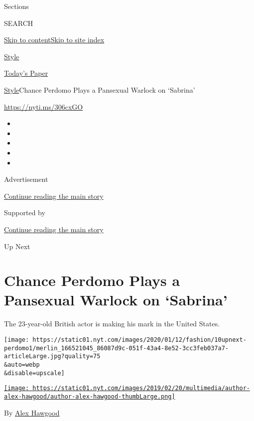 Sections

SEARCH

\protect\hyperlink{site-content}{Skip to
content}\protect\hyperlink{site-index}{Skip to site index}

\href{https://www.nytimes.com/section/style}{Style}

\href{https://myaccount.nytimes.com/auth/login?response_type=cookie\&client_id=vi}{}

\href{https://www.nytimes.com/section/todayspaper}{Today's Paper}

\href{/section/style}{Style}\textbar{}Chance Perdomo Plays a Pansexual
Warlock on `Sabrina'

\href{https://nyti.ms/306cxGO}{https://nyti.ms/306cxGO}

\begin{itemize}
\item
\item
\item
\item
\item
\end{itemize}

Advertisement

\protect\hyperlink{after-top}{Continue reading the main story}

Supported by

\protect\hyperlink{after-sponsor}{Continue reading the main story}

Up Next

\hypertarget{chance-perdomo-plays-a-pansexual-warlock-on-sabrina}{%
\section{Chance Perdomo Plays a Pansexual Warlock on
`Sabrina'}\label{chance-perdomo-plays-a-pansexual-warlock-on-sabrina}}

The 23-year-old British actor is making his mark in the United States.

\texttt{[image: https://static01.nyt.com/images/2020/01/12/fashion/10upnext-perdomo1/merlin\_166521045\_86087d9c-051f-43a4-8e52-3cc3feb037a7-articleLarge.jpg?quality=75\\\&auto=webp\\\&disable=upscale]}

\href{https://www.nytimes.com/by/alex-hawgood}{\texttt{[image: https://static01.nyt.com/images/2019/02/20/multimedia/author-alex-hawgood/author-alex-hawgood-thumbLarge.png]}}

By \href{https://www.nytimes.com/by/alex-hawgood}{Alex Hawgood}

